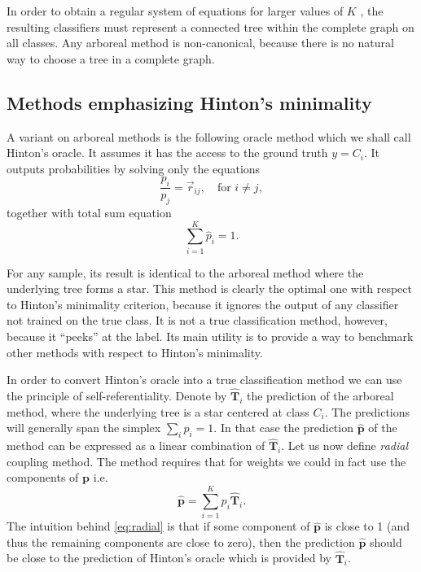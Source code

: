 \documentclass[twoside,11pt]{article}
\begin{document}
In order to obtain a regular system of equations for  larger values of $K$ , the resulting classifiers must represent a connected tree within the complete graph on all classes. Any arboreal method is non-canonical, because there is no natural way to choose a tree in a complete graph.

\subsection{Methods emphasizing Hinton's minimality}

A variant on arboreal methods is the following oracle method which we shall call Hinton's oracle. It  assumes it has the access to the ground truth $y = C_i$. It outputs probabilities by solving only the equations
$$
\frac{p_i}{p_j} = \vec{r}_{ij},\quad \textrm{for }i\not = j,
$$
together  with total sum equation
$$
\sum_{i=1}^K  \hat p_i = 1.
$$

For any sample, its result is identical to the arboreal method where the underlying tree forms a star. This method is clearly the optimal one with respect to Hinton's minimality criterion, because it ignores the output of any classifier not trained on the true class. It is not a true classification method, however, because it ``peeks'' at the label. Its main utility is to provide a way to benchmark other methods with respect to Hinton's minimality.

In order to convert Hinton's oracle into a true classification method we can use the principle of self-referentiality.  Denote by $\hat{\boldsymbol{T}}_i$ the prediction of the arboreal method, where the underlying tree is a star centered at class $C_i$. The predictions will generally span the simplex $\sum_i \hat p_i = 1$. In that case the prediction $\hat{\boldsymbol{p}}$ of the method  can be expressed as a linear combination of $\hat{\boldsymbol{T}}_i$. Let us now define \emph{radial} coupling method. The  method requires that for  weights we could in fact use the components of $\boldsymbol{p}$ i.e.
\begin{equation}
	\hat {\boldsymbol{p}} = \sum_{i=1}^K p_i \hat{\boldsymbol{T}}_i. \label{eq:radial}
\end{equation}
%
The intuition behind \eqref{eq:radial} is that if some component of $\hat{\boldsymbol{p}}$ is close to 1 (and thus the remaining components are close to zero), then the prediction $\hat{\boldsymbol{p}}$ should be close to the prediction of Hinton's oracle which is provided by $\hat{\boldsymbol{T}}_i$.
\end{document}
